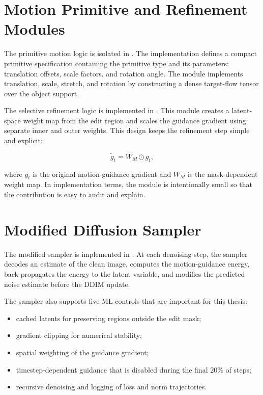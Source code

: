 \section{Motion Primitive and Refinement Modules}

The primitive motion logic is isolated in . The implementation defines a compact primitive specification containing the primitive type and its parameters: translation offsets, scale factors, and rotation angle. The module implements translation, scale, stretch, and rotation by constructing a dense target-flow tensor over the object support.

The selective refinement logic is implemented in . This module creates a latent-space weight map from the edit region and scales the guidance gradient using separate inner and outer weights. This design keeps the refinement step simple and explicit:

\begin{equation}
\tilde{g}_t = W_M \odot g_t,
\end{equation}

where $g_t$ is the original motion-guidance gradient and $W_M$ is the mask-dependent weight map. In implementation terms, the module is intentionally small so that the contribution is easy to audit and explain.

\section{Modified Diffusion Sampler}

The modified sampler is implemented in . At each denoising step, the sampler decodes an estimate of the clean image, computes the motion-guidance energy, back-propagates the energy to the latent variable, and modifies the predicted noise estimate before the DDIM update.

The sampler also supports five ML controls that are important for this thesis:

\begin{itemize}
  \item cached latents for preserving regions outside the edit mask;
  \item gradient clipping for numerical stability;
  \item spatial weighting of the guidance gradient;
  \item timestep-dependent guidance that is disabled during the final $20\%$ of steps;
  \item recursive denoising and logging of loss and norm trajectories.
\end{itemize}

